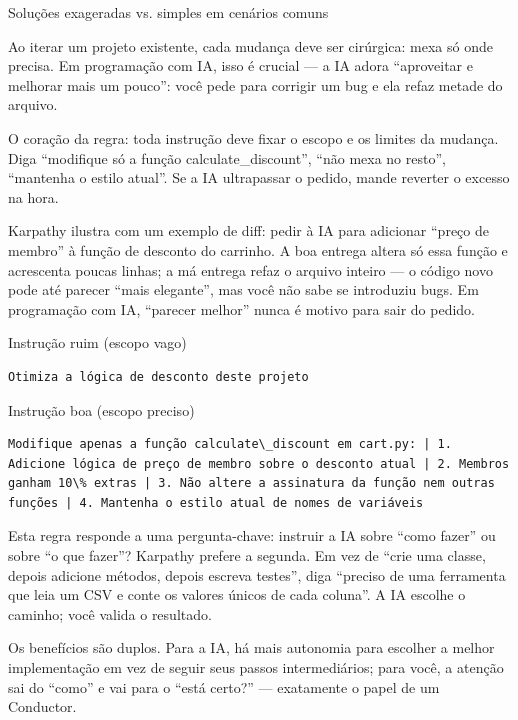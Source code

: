 \begin{center}\small\color{gray}Soluções exageradas vs. simples em cenários comuns\end{center}


Ao iterar um projeto existente, cada mudança deve ser cirúrgica: mexa só onde precisa. Em programação com IA, isso é crucial — a IA adora “aproveitar e melhorar mais um pouco”: você pede para corrigir um bug e ela refaz metade do arquivo.

O coração da regra: toda instrução deve fixar o escopo e os limites da mudança. Diga “modifique só a função calculate\_discount”, “não mexa no resto”, “mantenha o estilo atual”. Se a IA ultrapassar o pedido, mande reverter o excesso na hora.

Karpathy ilustra com um exemplo de diff: pedir à IA para adicionar “preço de membro” à função de desconto do carrinho. A boa entrega altera só essa função e acrescenta poucas linhas; a má entrega refaz o arquivo inteiro — o código novo pode até parecer “mais elegante”, mas você não sabe se introduziu bugs. Em programação com IA, “parecer melhor” nunca é motivo para sair do pedido.

Instrução ruim (escopo vago)

\begin{lstlisting}
Otimiza a lógica de desconto deste projeto
\end{lstlisting}

Instrução boa (escopo preciso)

\begin{lstlisting}
Modifique apenas a função calculate\_discount em cart.py: | 1. Adicione lógica de preço de membro sobre o desconto atual | 2. Membros ganham 10\% extras | 3. Não altere a assinatura da função nem outras funções | 4. Mantenha o estilo atual de nomes de variáveis
\end{lstlisting}


Esta regra responde a uma pergunta-chave: instruir a IA sobre “como fazer” ou sobre “o que fazer”? Karpathy prefere a segunda. Em vez de “crie uma classe, depois adicione métodos, depois escreva testes”, diga “preciso de uma ferramenta que leia um CSV e conte os valores únicos de cada coluna”. A IA escolhe o caminho; você valida o resultado.

Os benefícios são duplos. Para a IA, há mais autonomia para escolher a melhor implementação em vez de seguir seus passos intermediários; para você, a atenção sai do “como” e vai para o “está certo?” — exatamente o papel de um Conductor.

